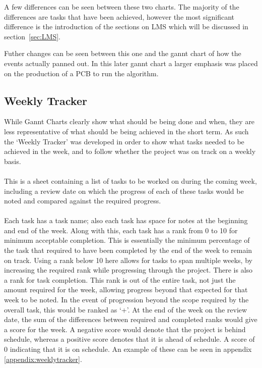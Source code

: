 \noindent
A few differences can be seen between these two charts.
The majority of the differences are tasks that have been achieved, however the most significant difference is the introduction of the sections on LMS which will be discussed in section~\ref{sec:LMS}.

Futher changes can be seen between this one and the gannt chart of how the events actually panned out.
In this later gannt chart a larger emphasis was placed on the production of a PCB to run the algorithm.

\subsection{Weekly Tracker}
While Gannt Charts clearly show what should be being done and when, they are less representative of what should be being achieved in the short term.
As such the `Weekly Tracker' was developed in order to show what tasks needed to be achieved in the week, and to follow whether the project was on track on a weekly basis.
\\
\\
This is a sheet containing a list of tasks to be worked on during the coming week, including a review date on which the progress of each of these tasks would be noted and compared against the required progress.
\\
\\
Each task has a task name; also each task has space for notes at the beginning and end of the week.
Along with this, each task has a rank from 0 to 10 for minimum acceptable completion.
This is essentially the minimum percentage of the task that required to have been completed by the end of the week to remain on track.
Using a rank below 10 here allows for tasks to span multiple weeks, by increasing the required rank while progressing through the project.
There is also a rank for task completion.
This rank is out of the entire task, not just the amount required for the week, allowing progress beyond that expected for that week to be noted.
In the event of progression beyond the scope required by the overall task, this would be ranked as `+'.
At the end of the week on the review date, the sum of the differences between required and completed ranks would give a score for the week.
A negative score would denote that the project is behind schedule, whereas a positive score denotes that it is ahead of schedule.
A score of 0 indicating that it is on schedule.
An example of these can be seen in appendix \ref{appendix:weeklytracker}.

